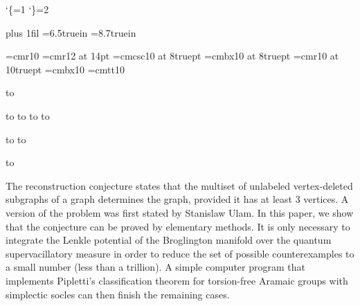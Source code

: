 
\catcode`\{=1
\catcode`\}=2


\parfillskip=0pt plus 1fil
\hsize=6.5truein
\vsize=8.7truein

\baselineskip=12pt

\countdef{}


\font\normal=cmr10
\font\big=cmr12 at 14pt
\font\footsc=cmcsc10 at 8truept
\font\footbf=cmbx10 at 8truept
\font\footrm=cmr10 at 10truept
\font\bold=cmbx10
\font\fixed=cmtt10

\fam 0pt \normal

\hbox to 


\hbox to 
\hbox to 
\hbox to 
\hbox to 


\hbox to 
\hbox to 


\hbox to 
{
\advance \leftskip  20pt
\advance \rightskip 20pt
\noindent
  The reconstruction conjecture states that the multiset of unlabeled
  vertex-deleted subgraphs of a graph determines the graph, provided it
  has at least 3 vertices.  A version of the problem was first stated
  by Stanislaw Ulam.  In this paper, we show that the conjecture can
  be proved by elementary methods.  It is only necessary to integrate
  the Lenkle potential of the Broglington manifold over the quantum
  supervacillatory measure in order to reduce the set of possible
  counterexamples to a small number (less than a trillion).  A simple
  computer program that implements Pipletti's classification theorem
  for torsion-free Aramaic groups with simplectic socles can then
  finish the remaining cases.
\par
}

